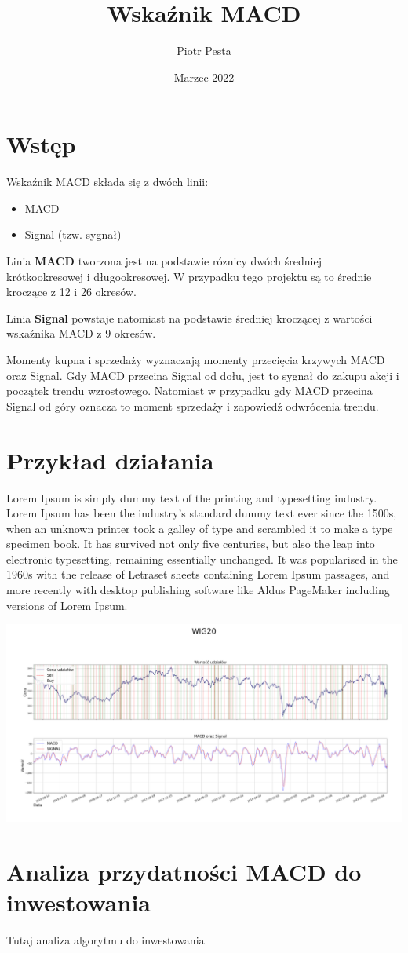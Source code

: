 \documentclass{article}
\title{Wskaźnik MACD}
\author{Piotr Pesta}
\date{Marzec 2022}
\begin{document}
\maketitle

\section{Wstęp}
    Wskaźnik MACD składa się z dwóch linii:
    \begin{itemize}
        \item MACD
        \item Signal (tzw. sygnał)
    \end{itemize}

    Linia \textbf{MACD} tworzona jest na podstawie róznicy dwóch średniej krótkookresowej i długookresowej.
    W przypadku tego projektu są to średnie kroczące z 12 i 26 okresów.

    Linia \textbf{Signal} powstaje natomiast na podstawie średniej kroczącej z wartości wskaźnika MACD z 9 okresów.

    Momenty kupna i sprzedaży wyznaczają momenty przecięcia krzywych MACD oraz Signal. Gdy MACD przecina
    Signal od dołu, jest to sygnał do zakupu akcji i początek trendu wzrostowego. Natomiast w przypadku gdy MACD przecina Signal od góry
    oznacza to moment sprzedaży i zapowiedź odwrócenia trendu.

\section{Przykład działania}
    Lorem Ipsum is simply dummy text of the printing and typesetting industry. Lorem Ipsum has been the industry's standard dummy text ever since the 1500s, when an unknown printer took a galley of type and scrambled it to make a type specimen book. It has survived not only five centuries, but also the leap into electronic typesetting, remaining essentially unchanged. It was popularised in the 1960s with the release of Letraset sheets containing Lorem Ipsum passages, and more recently with desktop publishing software like Aldus PageMaker including versions of Lorem Ipsum.


   \noindent\includegraphics[width=\textwidth]{WIG20}
    \centering

\section{Analiza przydatności MACD do inwestowania}

    Tutaj analiza algorytmu do inwestowania
\end{document}
